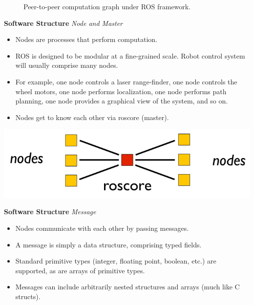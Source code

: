 \documentclass[a4paper, 11pt, conference]{ieeeconf}       %
\begin{document}
\begin{figure}[htpb]
  \centering
  \caption{Peer-to-peer computation graph under ROS framework.}
  \label{fig:framework}
\end{figure}



\textbf{Software Structure}
\textit{Node and Master}

\begin{itemize}
  \item Nodes are processes that perform computation. 
  \item ROS is designed to be modular at a fine-grained scale. Robot control system will usually comprise many nodes.
  \item For example, one node controls a laser range-finder, one node controls the wheel motors, one node performs localization, one node performs path planning, one node provides a graphical view of the system, and so on.
  \item Nodes get to know each other via roscore (master).
\end{itemize}

\begin{center}
  \includegraphics[width=.6\textwidth]{nodes}
\end{center}




\textbf{Software Structure}
\textit{Message}

\begin{itemize}
  \item Nodes communicate with each other by passing messages.
  \item A message is simply a data structure, comprising typed fields. 
  \item Standard primitive types (integer, floating point, boolean, etc.) are supported, as are arrays of primitive types. 
  \item Messages can include arbitrarily nested structures and arrays (much like C structs).
\end{itemize}
\end{document}
